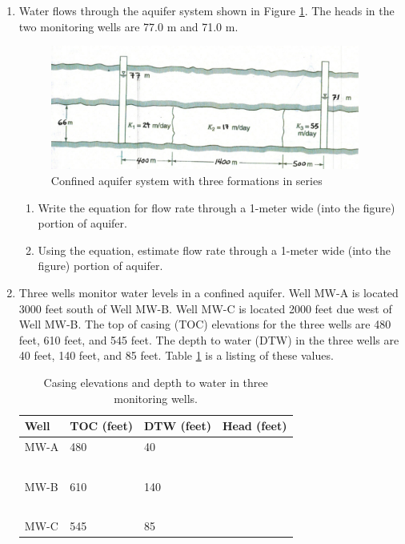 \documentclass[12pt]{article}
\begin{document}
\begin{enumerate}
\item Water flows through the aquifer system shown in Figure \ref{fig:aquifer-77.pdf}.  The heads in the two monitoring wells are 77.0 m and 71.0 m. 
\begin{figure}[h!] %
   \centering
   \includegraphics[width=4in]{aquifer-77.pdf} 
   \caption{Confined aquifer system with three formations in series}
   \label{fig:aquifer-77.pdf}
\end{figure}
\begin{enumerate}
\item Write the equation for flow rate through a 1-meter wide (into the figure) portion of aquifer.
\item Using the equation, estimate flow rate through a 1-meter wide (into the figure) portion of aquifer.
\end{enumerate}

\clearpage

\item Three wells monitor water levels in a confined aquifer.  Well MW-A is located 3000 feet south of Well MW-B.   Well MW-C is located 2000 feet due west of Well MW-B.
The top of casing (TOC) elevations for the three wells are 480 feet, 610 feet, and 545 feet.   The depth to water (DTW) in the three wells are 40 feet, 140 feet, and 85 feet.   Table \ref{tab:piezometer-data} is a listing of these values.

\begin{table}[htbp]
   \centering
   \caption{Casing elevations and depth to water in three monitoring wells.}
   \begin{tabular}{p{1in}p{1in}p{1in}p{1in}} %
Well & TOC (feet) & DTW (feet) & Head (feet) \\
\hline
\hline
MW-A & 480 & 40 & ~ \\
~ & ~ & ~ & ~ \\
MW-B & 610 & 140 & ~ \\
~ & ~ & ~ & ~ \\
MW-C & 545 & 85 & ~  \\
\hline
\end{tabular}
\label{tab:piezometer-data}
\end{table}


\end{enumerate}
\end{document}
